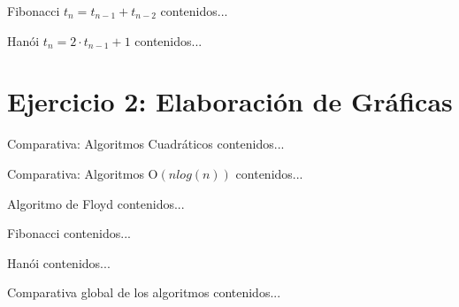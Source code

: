 \documentclass[10pt,compress,usetitleprogressbar,mathserif]{beamer}
\begin{document}
\begin{frame}{Fibonacci $t_n=t_{n-1}+t_{n-2}$}
	contenidos...
\end{frame}

\begin{frame}{Hanói $t_n=2 \cdot t_{n-1}+1 $}
	contenidos...
\end{frame}

\section{Ejercicio 2: Elaboración de Gráficas}


\begin{frame}{Comparativa: Algoritmos Cuadráticos}
	contenidos...
\end{frame}

\begin{frame}{Comparativa: Algoritmos O$(nlog(n))$}
	contenidos...
\end{frame}

\begin{frame}{Algoritmo de Floyd}
	contenidos...
\end{frame}

\begin{frame}{Fibonacci}
	contenidos...
\end{frame}

\begin{frame}{Hanói}
	contenidos...
\end{frame}

\begin{frame}{Comparativa global de los algoritmos}
	contenidos...
\end{frame}
\end{document}
